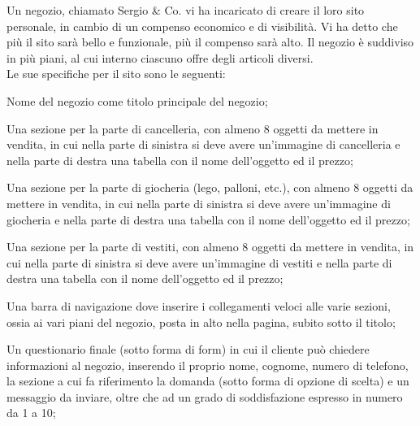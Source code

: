 \documentclass[addpoints]{exam}
\begin{document}
 
 \begin{center}
 \end{center}
 
\vspace{5mm}
 
 
\vspace{5mm}
 
 
\vspace{10mm}
Un negozio, chiamato Sergio \& Co. vi ha incaricato di creare il loro sito personale, in cambio di un compenso economico e di visibilità. Vi ha detto che più il sito sarà bello e funzionale, più il compenso sarà alto. Il negozio è suddiviso in più piani, al cui interno ciascuno offre degli articoli diversi. \\
Le sue specifiche per il sito sono le seguenti:
 
\begin{questions}
	
\question[1] Nome del negozio come titolo principale del negozio;

\question[4] Una sezione per la parte di cancelleria, con almeno 8 oggetti da mettere in vendita, in cui nella parte di sinistra si deve avere un'immagine di cancelleria e nella parte di destra una tabella con il nome dell'oggetto ed il prezzo;

\question[4] Una sezione per la parte di giocheria (lego, palloni, etc.), con almeno 8 oggetti da mettere in vendita, in cui nella parte di sinistra si deve avere un'immagine di giocheria e nella parte di destra una tabella con il nome dell'oggetto ed il prezzo;

\question[4] Una sezione per la parte di vestiti, con almeno 8 oggetti da mettere in vendita, in cui nella parte di sinistra si deve avere un'immagine di vestiti e nella parte di destra una tabella con il nome dell'oggetto ed il prezzo;

\question[3] Una barra di navigazione dove inserire i collegamenti veloci alle varie sezioni, ossia ai vari piani del negozio, posta in alto nella pagina, subito sotto il titolo;

\question[4] Un questionario finale (sotto forma di form) in cui il cliente può chiedere informazioni al negozio, inserendo il proprio nome, cognome, numero di telefono, la sezione a cui fa riferimento la domanda (sotto forma di opzione di scelta) e un messaggio da inviare, oltre che ad un grado di soddisfazione espresso in numero da 1 a 10;

\end{questions}

\begin{center}
	\gradetable[h][questions]
\end{center}
\end{document}
